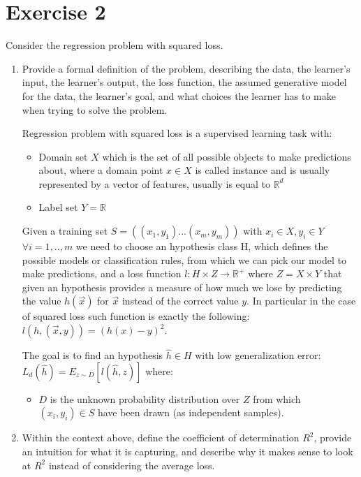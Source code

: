 \documentclass[a4paper,11pt,oneside]{book}
\begin{document}
\section{Exercise 2}
Consider the regression problem with squared loss.

\begin{enumerate}
\item Provide a formal definition of the problem, describing the data, the learner's input, the learner's output, the loss function, the assumed generative model for the data, the learner's goal, and what choices the learner has to make when trying to solve the problem.
\begin{solution}
    Regression problem with squared loss is a supervised learning task with:
    
    \begin{itemize}
    \item Domain set $X$ which is the set of all possible objects to make predictions about, where a domain point $x \in X$ is called instance and is usually represented by a vector of features, usually is equal to $\mathbb{R}^d$
    
    \item Label set $Y = \mathbb{R}$
    \end{itemize}
    
    Given a training set $S = ((x_1, y_1) ... (x_m, y_m))$ with $x_i \in X, y_i \in Y$ $\forall i = 1,..,m$ we need to choose an hypothesis class H, which defines the possible models or classification rules, from which we can pick our model to make predictions, and a loss function $l: H \times Z \to \mathbb{R}^+$ where $Z = X \times Y$ that given an hypothesis provides a measure of how much we lose by predicting the value $h(\vec{x})$ for $\vec{x}$ instead of the correct value $y$. In particular in the case of squared loss such function is exactly the following: $l(h, (\vec{x}, y)) = (h(x) - y)^2$.
    
    The goal is to find an hypothesis $\hat{h} \in H$ with low generalization error: $L_d(\hat{h}) = E_{z\sim D}[l(\hat{h},z)]$ where:
    
    \begin{itemize}
    \item $D$ is the unknown probability distribution over $Z$ from which $(x_i, y_i) \in S$ have been drawn (as independent samples).
    \end{itemize}
\end{solution}

\item Within the context above, define the coefficient of determination $R^2$, provide an intuition for what it is capturing, and describe why it makes sense to look at $R^2$ instead of considering the average loss.


\end{enumerate}
\end{document}
